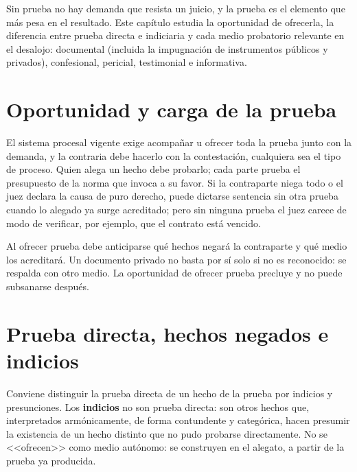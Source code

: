 \documentclass[12pt,oneside]{book}
\begin{document}
Sin prueba no hay demanda que resista un juicio, y la prueba es el elemento que más pesa en el resultado. Este capítulo estudia la oportunidad de ofrecerla, la diferencia entre prueba directa e indiciaria y cada medio probatorio relevante en el desalojo: documental (incluida la impugnación de instrumentos públicos y privados), confesional, pericial, testimonial e informativa.

\section{Oportunidad y carga de la prueba}

El sistema procesal vigente exige acompañar u ofrecer toda la prueba junto con la demanda, y la contraria debe hacerlo con la contestación, cualquiera sea el tipo de proceso. Quien alega un hecho debe probarlo; cada parte prueba el presupuesto de la norma que invoca a su favor. Si la contraparte niega todo o el juez declara la causa de puro derecho, puede dictarse sentencia sin otra prueba cuando lo alegado ya surge acreditado; pero sin ninguna prueba el juez carece de modo de verificar, por ejemplo, que el contrato está vencido.

\begin{important}
Al ofrecer prueba debe anticiparse qué hechos negará la contraparte y qué medio los acreditará. Un documento privado no basta por sí solo si no es reconocido: se respalda con otro medio. La oportunidad de ofrecer prueba precluye y no puede subsanarse después.
\end{important}

\section{Prueba directa, hechos negados e indicios}

Conviene distinguir la prueba directa de un hecho de la prueba por indicios y presunciones. Los \textbf{indicios} no son prueba directa: son otros hechos que, interpretados armónicamente, de forma contundente y categórica, hacen presumir la existencia de un hecho distinto que no pudo probarse directamente. No se <<ofrecen>> como medio autónomo: se construyen en el alegato, a partir de la prueba ya producida.
\end{document}
